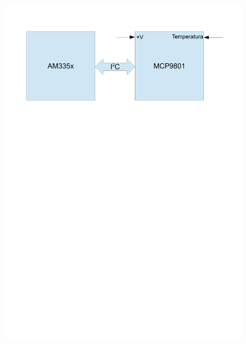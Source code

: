 \documentclass[dvipsnames,table]{beamer}
\begin{document}
\begin{frame}
\includegraphics[width=300pt]{img_am335x-mcp9801.pdf}
\end{frame}


\end{document}
